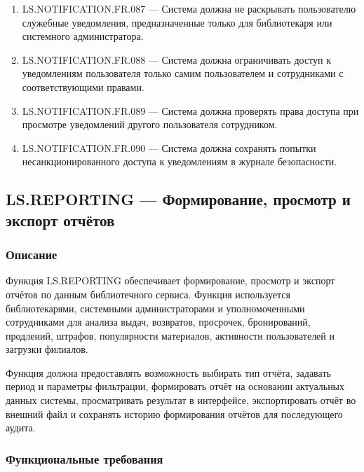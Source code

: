 \documentclass[12pt,a4paper]{article}
\begin{document}
\begin{enumerate}
		\item LS.NOTIFICATION.FR.087 --- Система должна не раскрывать пользователю служебные
		уведомления, предназначенные только для библиотекаря или системного администратора.
		
		\item LS.NOTIFICATION.FR.088 --- Система должна ограничивать доступ к уведомлениям
		пользователя только самим пользователем и сотрудниками с соответствующими правами.
		
		\item LS.NOTIFICATION.FR.089 --- Система должна проверять права доступа при просмотре
		уведомлений другого пользователя сотрудником.
		
		\item LS.NOTIFICATION.FR.090 --- Система должна сохранять попытки несанкционированного
		доступа к уведомлениям в журнале безопасности.
	\end{enumerate}
	
		\subsection{LS.REPORTING --- Формирование, просмотр и экспорт отчётов}
	
	\subsubsection{Описание}
	
	Функция LS.REPORTING обеспечивает формирование, просмотр и экспорт отчётов
	по данным библиотечного сервиса. Функция используется библиотекарями,
	системными администраторами и уполномоченными сотрудниками для анализа
	выдач, возвратов, просрочек, бронирований, продлений, штрафов, популярности
	материалов, активности пользователей и загрузки филиалов.
	
	Функция должна предоставлять возможность выбирать тип отчёта, задавать период
	и параметры фильтрации, формировать отчёт на основании актуальных данных
	системы, просматривать результат в интерфейсе, экспортировать отчёт во внешний
	файл и сохранять историю формирования отчётов для последующего аудита.
	
	\subsubsection{Функциональные требования}
	
\end{document}
